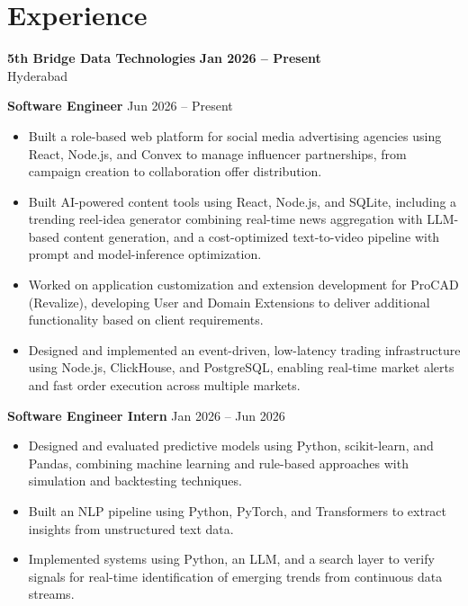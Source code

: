 \documentclass[a4paper,11pt]{article}
\newcommand{\resumeItem}[1]{\item \small{#1}}
\newcommand{\resumeSubheading}[4]{%
  \textbf{#1} \hfill \textbf{#2} \\
{#3} \hfill {#4}
}
\newcommand{\resumeSubHeadingListStart}{\begin{itemize}}
\newcommand{\resumeSubHeadingListEnd}{\end{itemize}}
\begin{document}
\section*{Experience}

\resumeSubheading
{5th Bridge Data Technologies}{Jan 2026 -- Present}
{Hyderabad}{}

\textbf{Software Engineer} \hfill {Jun 2026 -- Present}
\resumeSubHeadingListStart
\resumeItem{Built a role-based web platform for social media advertising agencies using React, Node.js, and Convex to manage influencer partnerships, from campaign creation to collaboration offer distribution.}
\resumeItem{Built AI-powered content tools using React, Node.js, and SQLite, including a trending reel-idea generator combining real-time news aggregation with LLM-based content generation, and a cost-optimized text-to-video pipeline with prompt and model-inference optimization.}
\resumeItem{Worked on application customization and extension development for ProCAD (Revalize), developing User and Domain Extensions to deliver additional functionality based on client requirements.}
\resumeItem{Designed and implemented an event-driven, low-latency trading infrastructure using Node.js, ClickHouse, and PostgreSQL, enabling real-time market alerts and fast order execution across multiple markets.}
\resumeSubHeadingListEnd

\textbf{Software Engineer Intern} \hfill {Jan 2026 -- Jun 2026}
\resumeSubHeadingListStart
\resumeItem{Designed and evaluated predictive models using Python, scikit-learn, and Pandas, combining machine learning and rule-based approaches with simulation and backtesting techniques.}
\resumeItem{Built an NLP pipeline using Python, PyTorch, and Transformers to extract insights from unstructured text data.}
\resumeItem{Implemented systems using Python, an LLM, and a search layer to verify signals for real-time identification of emerging trends from continuous data streams.}
\resumeSubHeadingListEnd


\end{document}
